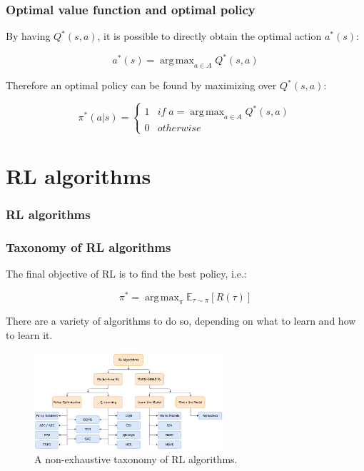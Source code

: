 \documentclass[9pt]{beamer}
\newcommand{\E}{{\mathbb E}}
\DeclareMathOperator*{\argmax}{arg\,max}
\begin{document}
\begin{frame}
	\frametitle{Optimal value function and optimal policy }
	By having $Q^*(s,a)$, it is possible to directly obtain the optimal action $a^*(s)$:

	\begin{equation}
		a^*(s) = \argmax_{a \in A} Q^* (s,a)
	\end{equation}

	Therefore an optimal policy can be found by maximizing over $Q^*(s,a)$:

	\begin{equation}
		\pi^*(a|s) = 
		\begin{cases}
			1 & if \; a = \argmax_{a \in A} Q^*(s,a)\\
			0 & otherwise
		\end{cases}
		\label{eq:opt-policy}
	\end{equation}

\end{frame}


\section{RL algorithms}


\begin{frame}
	\frametitle{RL algorithms}
	
	\tableofcontents[ 
	currentsubsection, 
	hideothersubsections, 
	sectionstyle=show/shaded,
	]
	
\end{frame}


\begin{frame}
	\frametitle{Taxonomy of RL algorithms}
	The final objective of RL is to find the best policy, i.e.:

	\begin{equation}
		\pi^* = \argmax_\pi \E_{\tau \sim \pi}{[R(\tau)]}
		\label{eq:objective}
	\end{equation}
	

	There are a variety of algorithms to do so, depending on what to learn and how to learn it.

	\begin{figure}[h]
		\centering
		\includegraphics[width=7cm]{rl-taxonomy.png}
		\caption{A non-exhaustive taxonomy of RL algorithms.\cite{SpinningUp2018}}
		\label{fig:rl-taxonomy}
	\end{figure}

\end{frame}
\end{document}
